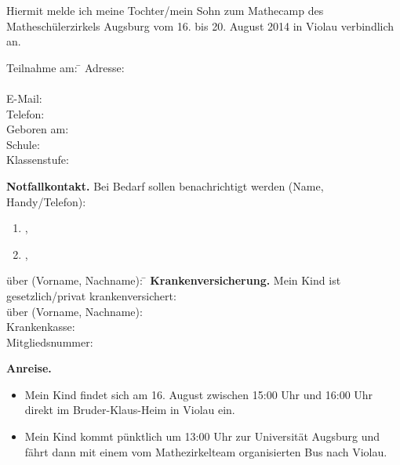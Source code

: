 \documentclass{zettel}
\begin{document}
\renewcommand{\betreff}{Anmeldung zum Mathecamp des Matheschülerzirkels Augsburg}


Hiermit melde ich meine Tochter/mein Sohn \freistLaenger{} zum Mathecamp des
Matheschülerzirkels Augsburg vom 16. bis 20. August 2014 in
Violau verbindlich an.

\vspace{-0.5em}
\doublespacing
\begin{tabbing}
  Teilnahme am: \= \kill
  Adresse: \> \freistLang \\
  \> \freistLang \\
  E-Mail: \> \freistLang \\
  Telefon: \> \freistLang \\
  Geboren am: \> \freistLang \\
  Schule: \> \freistLang \\
  Klassenstufe: \> \freistKurz
\end{tabbing}

\begin{shaded}
\textbf{Notfallkontakt.} Bei Bedarf sollen benachrichtigt werden (Name, Handy/Telefon):
\begin{enumerate}
\item \freist{7cm},\quad\freist{7cm}
\item \freist{7cm},\quad\freist{7cm}
\end{enumerate}
\end{shaded}

\begin{shaded}
\vspace{-2em}
\begin{tabbing}
  über (Vorname, Nachname): \= \kill
  \textbf{Krankenversicherung.} Mein Kind ist gesetzlich/privat krankenversichert: \\
  über (Vorname, Nachname): \> \freistLang \\
  Krankenkasse: \> \freistLang \\
  Mitgliedsnummer: \> \freistLang
\end{tabbing}
\vspace{-1em}
\end{shaded}

\newpage
\vspace*{0cm}
\singlespacing

\begin{shaded}
\textbf{Anreise.}
\begin{itemize}
\item[\checkbox] Mein Kind findet sich am 16. August zwischen 15:00 Uhr und 16:00
Uhr direkt im Bruder-Klaus-Heim in Violau ein.
\item[\checkbox] Mein Kind kommt pünktlich um 13:00 Uhr zur Universität
Augsburg und fährt dann mit einem vom Mathezirkelteam organisierten Bus nach Violau.
\end{itemize}
\end{shaded}
\end{document}
